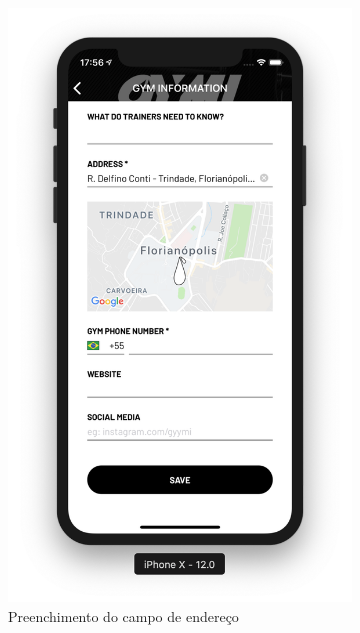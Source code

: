 \begin{figure}[H]
	\centering
    \begin{subfigure}[b]{0.4\textwidth}
        \includegraphics[width=\textwidth]{pfc/figuras/delfino-conti-2.png}
        \caption{Preenchimento do campo de endereço}
        \label{fig:address-field}
    \end{subfigure}
    ~
	\begin{subfigure}[b]{0.4\textwidth}

\end{subfigure}
\end{figure}
